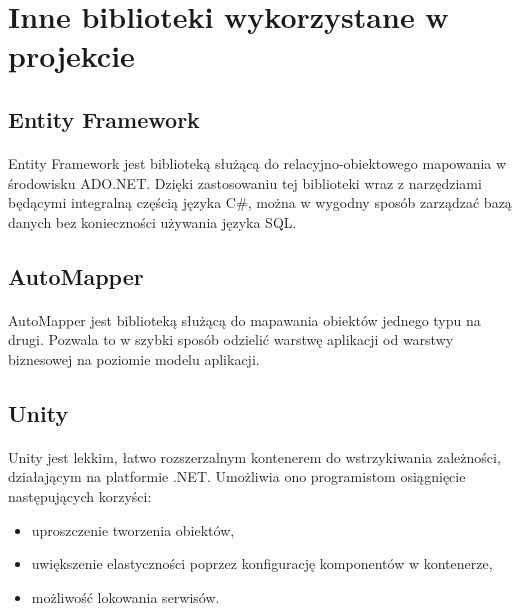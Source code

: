 \section{Inne biblioteki wykorzystane w projekcie} %
\label{sec:inne_biblioteki_wykorzystane_w_projekcie}

\subsection{Entity Framework} 
\label{sub:EntityFramework}
\paragraph{}
Entity Framework \cite{ef} jest biblioteką służącą do relacyjno-obiektowego mapowania w środowisku ADO.NET. Dzięki zastosowaniu tej biblioteki wraz z narzędziami będącymi integralną częścią języka C\#, można w wygodny sposób zarządzać bazą danych bez konieczności używania języka SQL.

\subsection{AutoMapper} %
\label{sub:automapper}
\paragraph{} %
\label{par:}

AutoMapper \cite{au} jest biblioteką służącą do mapawania obiektów jednego typu na drugi. Pozwala to w szybki sposób odzielić warstwę aplikacji od warstwy biznesowej na poziomie modelu aplikacji.

\subsection{Unity} %
\label{sub:unity}
\paragraph{} %
\label{par:paragraph_name}
Unity \cite{unity} jest lekkim, łatwo rozszerzalnym kontenerem do wstrzykiwania zależności, działającym na platformie .NET. Umożliwia ono programistom osiągnięcie następujących korzyści:
\begin{itemize}
\item uproszczenie tworzenia obiektów,
\item uwiększenie elastyczności poprzez konfigurację komponentów w kontenerze,
\item możliwość lokowania serwisów.
\end{itemize}
